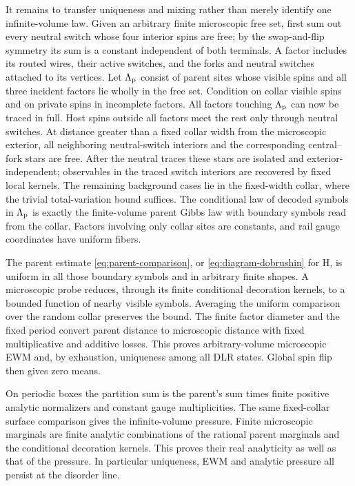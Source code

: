 It remains to transfer uniqueness and mixing rather than merely identify one infinite-volume law. Given an arbitrary finite microscopic free set, first sum out every neutral switch whose four interior spins are free; by the swap-and-flip symmetry its sum is a constant independent of both terminals. A factor includes its routed wires, their active switches, and the forks and neutral switches attached to its vertices. Let \(\Lambda_{\rm p}\) consist of parent sites whose visible spins and all three incident factors lie wholly in the free set. Condition on collar visible spins and on private spins in incomplete factors. All factors touching \(\Lambda_{\rm p}\) can now be traced in full. Host spins outside all factors meet the rest only through neutral switches. At distance greater than a fixed collar width from the microscopic exterior, all neighboring neutral-switch interiors and the corresponding central--fork stars are free. After the neutral traces these stars are isolated and exterior-independent; observables in the traced switch interiors are recovered by fixed local kernels. The remaining background cases lie in the fixed-width collar, where the trivial total-variation bound suffices. The conditional law of decoded symbols in \(\Lambda_{\rm p}\) is exactly the finite-volume parent Gibbs law with boundary symbols read from the collar. Factors involving only collar sites are constants, and rail gauge coordinates have uniform fibers.

The parent estimate \eqref{eq:parent-comparison}, or \eqref{eq:diagram-dobrushin} for H, is uniform in all those boundary symbols and in arbitrary finite shapes. A microscopic probe reduces, through its finite conditional decoration kernels, to a bounded function of nearby visible symbols. Averaging the uniform comparison over the random collar preserves the bound. The finite factor diameter and the fixed period convert parent distance to microscopic distance with fixed multiplicative and additive losses. This proves arbitrary-volume microscopic EWM and, by exhaustion, uniqueness among all DLR states. Global spin flip then gives zero means.

On periodic boxes the partition sum is the parent's sum times finite positive analytic normalizers and constant gauge multiplicities. The same fixed-collar surface comparison gives the infinite-volume pressure. Finite microscopic marginals are finite analytic combinations of the rational parent marginals and the conditional decoration kernels. This proves their real analyticity as well as that of the pressure. In particular uniqueness, EWM and analytic pressure all persist at the disorder line.


